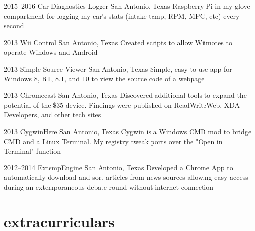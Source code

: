 \documentclass[]{friggeri-cv} %
\begin{document}
\begin{entrylist}

	\entry
	{2015--2016}
	{Car Diagnostics Logger}
	{San Antonio, Texas}
	{Raspberry Pi in my glove compartment for logging my car's stats (intake temp, RPM, MPG, etc) every  second}


	\entry
	{2013}
	{Wii Control}
	{San Antonio, Texas}
	{Created scripts to allow Wiimotes to operate Windows and Android}


	\entry
	{2013}
	{Simple Source Viewer}
	{San Antonio, Texas}
	{Simple, easy to use app for Windows 8, RT, 8.1, and 10 to view the source code of a webpage}


	\entry
	{2013}
	{Chromecast}
	{San Antonio, Texas}
	{Discovered additional tools to expand the potential of the \$35 device. Findings were published on ReadWriteWeb, XDA Developers, and other tech sites}


	\entry
	{2013}
	{CygwinHere}
	{San Antonio, Texas}
	{Cygwin is a Windows CMD mod to bridge CMD and a Linux Terminal. My registry tweak ports over the "Open in Terminal" function}


	\entry
	{2012--2014}
	{ExtempEngine}
	{San Antonio, Texas}
	{Developed a Chrome App to automatically download and sort articles from news sources allowing easy access during an extemporaneous debate round without internet connection}

\end{entrylist}

\section{extracurriculars}
\end{document}
